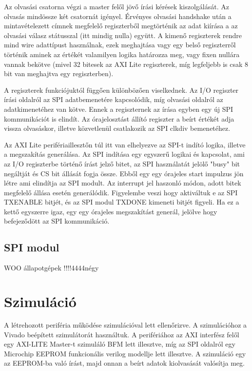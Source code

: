 \documentclass[a4paper,11pt]{article}
\begin{document}
Az olvasási csatorna végzi a master felől jövő írási kérések kiszolgálását. Az olvasás mindössze két csatornát igényel. Érvényes olvasási handshake után a mintavételezett címnek megfelelő regiszterből megtörténik az adat kiírása a az olvasási válasz státusszal (itt mindig nulla) együtt. A kimenő regiszterek rendre mind wire adattípust használnak, ezek meghajtása vagy egy belső regiszterről történik aminek az értékét valamilyen logika határozza meg, vagy fixen nullára vannak bekötve (mivel 32 bitesek az AXI Lite regiszterek, míg legfeljebb is csak 8 bit van meghajtva egy regiszterben).

A regiszterek funkciójuktól függően különbözően viselkednek. Az I/O regiszter írási oldalról az SPI adatbemenetére kapcsolódik, míg olvasási oldalról az adatkimenetéhez van kötve. Ennek a regiszternek az írása egyben egy új SPI kommunikációt is elindít. Az órajelosztást állító regiszter a beírt értékét adja vissza olvasáskor, illetve közvetlenül csatlakozik az SPI clkdiv bemenetéhez.

Az AXI Lite perifériaillesztőn túl itt van elhelyezve az SPI-t indító logika, illetve a megszakítás generálása. Az SPI indítása egy egyszerű logikai és kapcsolat, ami az I/O regiszterbe történő írást jelző bitet, az SPI használatát jelölő "busy" bit negáltját és CS bit állását fogja össze. Ebből egy egy órajeles start impulzus jön létre ami elindítja az SPI modult. Az interrupt jel haszonló módon, adott bitek megfelelő állása esetén generálódik. Figyelembe veszi hogy aktiváltuk e az SPI TX\textunderscore ENABLE bitjét, és az SPI modul TXDONE kimeneti bitjét figyeli. Ha ez a kettő egyszerre igaz, egy egy órajeles megszakítást generál, jelölve hogy befejeződött az SPI kommunikáció.

\subsection{SPI modul}

WOO állapotgépek !!!!4444négy

\section{Szimuláció}
A létrehozott periféria működése szimulációval lett ellenőrizve. A szimulációhoz a Vivado beépített szimulátorát használtuk. A perifériához az AXI interfész felől egy AXI-LITE Master-t szimuláló BFM lett illesztve, míg az SPI oldalról egy Microchip EEPROM funkcionális verilog modellje lett illesztve. A szimuláció egy az EEPROM-ba való írást, majd onnan a beírt adatok kiolvasását valósítja meg.
\end{document}
